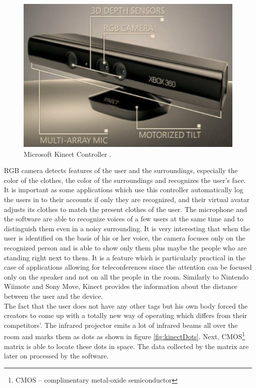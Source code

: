 \documentclass{jacsart}
\begin{document}
\begin{figure}[!t]
\includegraphics[width=0.9\linewidth]{./kinect}
\caption{Microsoft Kinect Controller \cite{Jr2011}.}
\label{fig:kinectOverview}
\end{figure} 

\indent RGB camera detects features of the user and the surroundings, especially the color of the clothes, the color of the surroundings and recognizes the user’s face. It is important as some applications which use this controller automatically log the users in to their accounts if only they are recognized, and their virtual avatar adjusts its clothes to match the present clothes of the user. The microphone and the software are able to recognize voices of a few users at the same time and to distinguish them even in a noisy surrounding. It is very interesting that when the user is identified on the basis of his or her voice, the camera focuses only on the recognized person and is able to show only them plus maybe the people who are standing right next to them. It is a feature which is particularly practical in the case of applications allowing for teleconferences since the attention can be focused only on the speaker and not on all the people in the room. Similarly to Nintendo Wiimote and Sony Move, Kinect provides the information about the distance between the user and the device.\\
\indent The fact that the user does not have any other tags but his own body forced the creators to come up with a totally new way of operating which differs from their competitors’. The infrared projector emits a lot of infrared beams all over the room and marks them as dots as shown in figure \ref{fig:kinectDots}. Next, CMOS\footnote{CMOS -- complimentary metal-oxide semiconductor}  matrix is able to locate these dots in space. The data collected by the matrix are later on processed by the software.\\
\end{document}

